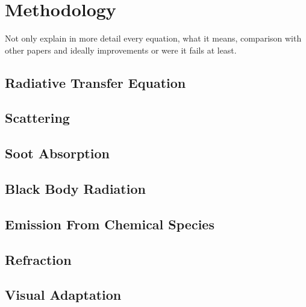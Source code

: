 \chapter{Methodology}
\label{ch:methodology}

Not only explain in more detail every equation, what it means, comparison with other papers and ideally improvements or were it fails at least.

\section{Radiative Transfer Equation}
\label{sec:radiative_transfer_equation}


\section{Scattering}
\label{sec:scattering}


\section{Soot Absorption}
\label{sec:soot_absorption}


\section{Black Body Radiation}
\label{sec:black_body_radiation}


\section{Emission From Chemical Species}
\label{sec:emission_from_chemical_species}



\section{Refraction}
\label{sec:refraction}



\section{Visual Adaptation}
\label{sec:visual_adaptation}


